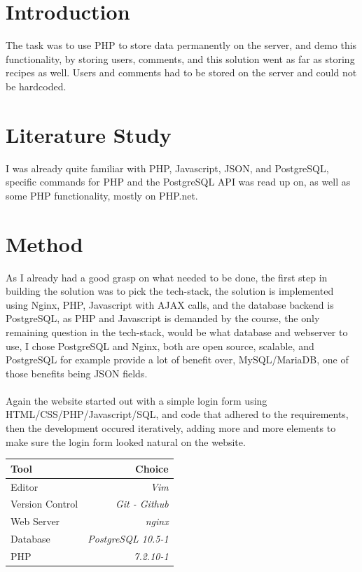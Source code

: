 \documentclass[a4paper]{scrartcl}
\begin{document}
\section{Introduction}

\noindent
The task was to use PHP to store data permanently on the server, and demo this functionality,
by storing users, comments, and this solution went as far as storing recipes as well.
Users and comments had to be stored on the server and could not be hardcoded.
\section{Literature Study}
I was already quite familiar with PHP, Javascript, JSON, and PostgreSQL, specific
commands for PHP and the PostgreSQL API was read up on, as well as some 
PHP functionality, mostly on PHP.net.

\section{Method}

\noindent
As I already had a good grasp on what needed to be done, the first step in building the solution was to pick the tech-stack,
the solution is implemented using Nginx, PHP, Javascript with AJAX calls, and the database backend
is PostgreSQL, as PHP and Javascript is demanded by the course, the only remaining question in the tech-stack,
would be what database and webserver to use,
I chose PostgreSQL and Nginx, both are open source, scalable, and PostgreSQL for example provide a lot of benefit over,
MySQL/MariaDB, one of those benefits being JSON fields.
\\\\
Again the website started out with a simple login form
using HTML/CSS/PHP/Javascript/SQL, and
code that adhered to the requirements, then the development
occured iteratively, adding more and more elements to make
sure the login form looked natural on the website.
\begin{center}
    \begin{tabular}{  l | r }
    Tool & Choice \\ 
    \hline
    Editor & \textit{Vim}\\
    Version Control & \textit{Git - Github}\\
    Web Server & \textit{nginx}\\
    Database & \textit{PostgreSQL 10.5-1}\\
    PHP & \textit{7.2.10-1} \\
    \end{tabular}
\end{center}
\noindent
\end{document}
